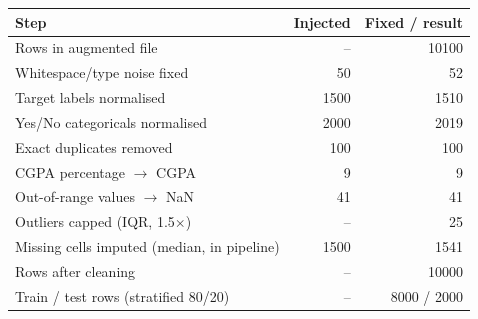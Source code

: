 \footnotesize
\setlength{\tabcolsep}{3pt}
\begin{tabular}{lrr}
\toprule
Step & Injected & Fixed / result \\
\midrule
Rows in augmented file & -- & 10100 \\
Whitespace/type noise fixed & 50 & 52 \\
Target labels normalised & 1500 & 1510 \\
Yes/No categoricals normalised & 2000 & 2019 \\
Exact duplicates removed & 100 & 100 \\
CGPA percentage $\rightarrow$ CGPA & 9 & 9 \\
Out-of-range values $\rightarrow$ NaN & 41 & 41 \\
Outliers capped (IQR, 1.5$\times$) & -- & 25 \\
Missing cells imputed (median, in pipeline) & 1500 & 1541 \\
Rows after cleaning & -- & 10000 \\
Train / test rows (stratified 80/20) & -- & 8000 / 2000 \\
\bottomrule
\end{tabular}
